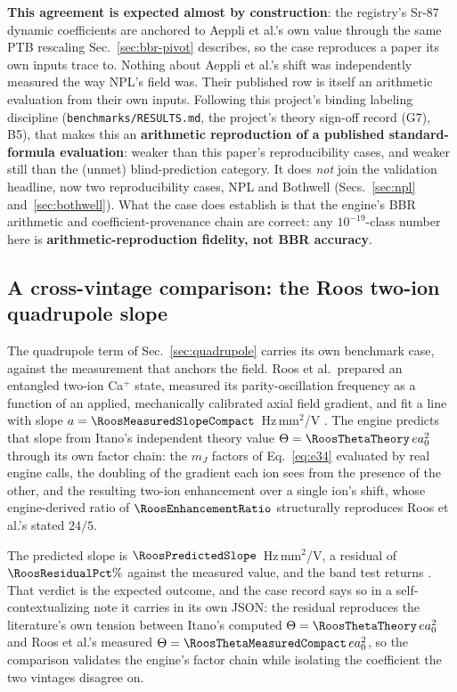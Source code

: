 \documentclass[aps,pra,superscriptaddress,groupedaddress,nofootinbib]{revtex4-2}
\begin{document}
\textbf{This agreement is expected almost by construction}: the
registry's Sr-87 dynamic coefficients are anchored to Aeppli et al.'s
own value through the same PTB rescaling
Sec.~\ref{sec:bbr-pivot} describes, so the case reproduces a paper its
own inputs trace to. Nothing about Aeppli et al.'s shift was independently
measured the way NPL's field was. Their published row is itself an
arithmetic evaluation from their own inputs. Following this project's binding
labeling discipline (\texttt{benchmarks/RESULTS.md},
the project's theory sign-off record (G7), B5), that makes this an
\textbf{arithmetic reproduction of a published standard-formula
evaluation}: weaker than this paper's reproducibility cases, and weaker
still than the (unmet) blind-prediction category. It does \emph{not}
join the validation headline, now two reproducibility cases, NPL and
Bothwell (Secs.~\ref{sec:npl} and~\ref{sec:bothwell}). What the case does establish is that the
engine's BBR arithmetic and coefficient-provenance chain are correct:
any $10^{-19}$-class number here is \textbf{arithmetic-reproduction
fidelity, not BBR accuracy}.

\subsection{A cross-vintage comparison: the Roos two-ion quadrupole slope}
\label{sec:roos}

The quadrupole term of Sec.~\ref{sec:quadrupole} carries its own
benchmark case, against the measurement that anchors the field. Roos
et al.\ prepared an entangled two-ion Ca$^+$ state, measured its
parity-oscillation frequency as a function of an applied, mechanically
calibrated axial field gradient, and fit a line with slope
$a=\RoosMeasuredSlopeCompact$~Hz\,mm$^2$/V
\cite{Roos2006}. The engine predicts that slope from Itano's
independent theory value
$\Theta=\RoosThetaTheory\,ea_0^2$~\cite{Itano2006} through its own
factor chain: the $m_J$ factors of Eq.~\eqref{eq:e34} evaluated by
real engine calls, the doubling of the gradient each ion sees from the
presence of the other, and the resulting two-ion enhancement over a
single ion's shift, whose engine-derived ratio of
$\RoosEnhancementRatio$ structurally reproduces Roos et al.'s stated
$24/5$.

The predicted slope is $\RoosPredictedSlope$~Hz\,mm$^2$/V, a residual
of $\RoosResidualPct\%$ against the measured value, and the band test
returns \textit{\RoosCrossVintageVerdict}. That verdict is the expected
outcome, and the case record says so in a self-contextualizing note it
carries in its own JSON: the residual reproduces the literature's own
tension between Itano's computed
$\Theta=\RoosThetaTheory\,ea_0^2$ and Roos et al.'s measured
$\Theta=\RoosThetaMeasuredCompact\,ea_0^2$, so the
comparison validates the engine's factor chain while isolating the
coefficient the two vintages disagree on.
\end{document}
